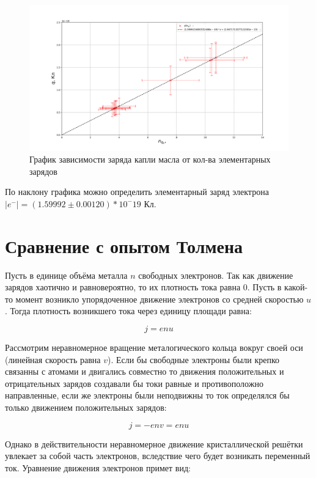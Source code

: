 \documentclass{lab}
\begin{document}
\begin{figure}[H]
    \centering
    \includegraphics[width=\textwidth]{graph.png}
    \caption{График зависимости заряда капли масла от кол-ва элементарных зарядов}
    \label{graph:q_n}
\end{figure}

По наклону графика можно определить элементарный заряд электрона $|e^{-}| = (1.59992 \pm 0.00120) * 10^-19$ Кл.

\section{Сравнение с опытом Толмена}

Пусть в единице объёма металла $n$ свободных электронов. Так как движение зарядов хаотично и равновероятно, то их плотность тока равна 0. Пусть в какой-то момент возникло упорядоченное движение электронов со средней скоростью $u$. Тогда плотность возникшего тока через единицу площади равна:

\begin{equation}
    j = enu
\end{equation}

Рассмотрим неравномерное вращение металогического кольца вокруг своей оси (линейная скорость равна $v$). Если бы свободные электроны были крепко связанны с атомами и двигались совместно то движения положительных и отрицательных зарядов создавали бы токи равные и противоположно направленные, если же электроны были неподвижны то ток определялся бы только движением положительных зарядов:

\begin{equation}
    j = -env = enu
\end{equation}

Однако в действительности неравномерное движение кристаллической решётки увлекает за собой часть электронов, вследствие чего будет возникать переменный ток.
Уравнение движения электронов примет вид:
\end{document}
